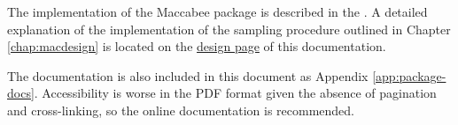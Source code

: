 \documentclass[../main.tex]{subfiles}
\begin{document}

The implementation of the Maccabee package is described in the . A detailed explanation of the implementation of the sampling procedure outlined in Chapter \ref{chap:macdesign} is located on the \href{\RTDurl/design.html}{design page} of this documentation.

\vspace{\baselineskip}

The documentation is also included in this document as Appendix \ref{app:package-docs}. Accessibility is worse in the PDF format given the absence of pagination and cross-linking, so the online documentation is recommended.
\end{document}
